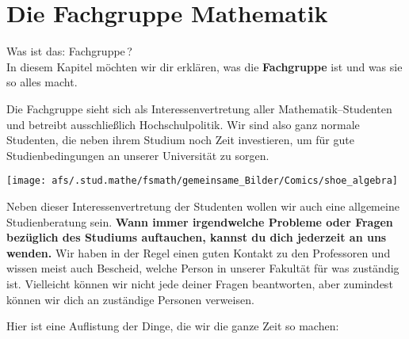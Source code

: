 \section{Die Fachgruppe Mathematik}

Was ist das: Fachgruppe\,?\\

In diesem Kapitel möchten wir dir erklären,
was die {\bf Fachgruppe} ist und was sie so alles macht.

Die Fachgruppe sieht sich als Interessenvertretung
aller Mathematik--Studenten und
betreibt ausschließlich \glqq Hochschulpolitik\grqq .
Wir sind also ganz normale Studenten,
die neben ihrem Studium noch Zeit investieren,
um für gute Studienbedingungen an unserer Universität zu sorgen.
\vspace*{1cm}
{
}
{
\begin{center}
\texttt{[image: afs/.stud.mathe/fsmath/gemeinsame\_Bilder/Comics/shoe\_algebra]}
\end{center}
}

Neben dieser Interessenvertretung der Studenten
wollen wir auch eine allgemeine Studienberatung sein.
{\bf Wann immer irgendwelche Probleme oder Fragen
     bezüglich des Studiums auftauchen,
     kannst du dich jederzeit an uns wenden.} 
Wir haben in der Regel einen guten Kontakt zu den Professoren
und wissen meist auch Bescheid,
welche Person in unserer Fakultät für was zuständig ist.
Vielleicht können wir nicht jede deiner Fragen beantworten,
aber zumindest können wir dich an zuständige Personen verweisen.

Hier ist eine Auf\-listung der Dinge,
die wir die ganze Zeit so machen:

